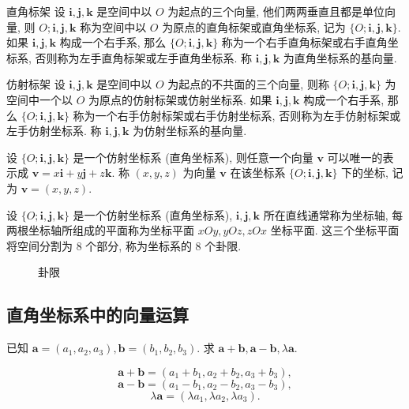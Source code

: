 \documentclass[cn,toc=twocol]{elegantbook}
\newcommand{\ve}[1]{\boldsymbol{#1}}
\newcommand{\FIGS}{
	\begin{figure}[H]
	\centering
}
\newcommand{\FIGE}{
	\end{figure}
}
\begin{document}
\begin{definition}{直角标架}
	设 $\ve{i},\ve{j},\ve{k}$ 是空间中以 $O$ 为起点的三个向量, 他们两两垂直且都是单位向量, 则 $O; \ve{i},\ve{j},\ve{k}$ 称为空间中以 $O$ 为原点的直角标架或直角坐标系, 记为 $\{O;\ve{i},\ve{j},\ve{k}\}$. 如果 $\ve{i},\ve{j},\ve{k}$ 构成一个右手系, 那么 $\{O; \ve{i},\ve{j},\ve{k}\}$ 称为一个右手直角标架或右手直角坐标系, 否则称为左手直角标架或左手直角坐标系. 称 $\ve{i},\ve{j},\ve{k}$ 为直角坐标系的基向量.
\end{definition}

\begin{definition}{仿射标架}
	设 $\ve{i},\ve{j},\ve{k}$ 是空间中以 $O$ 为起点的不共面的三个向量, 则称 $\{O;\ve{i},\ve{j},\ve{k}\}$ 为空间中一个以 $O$ 为原点的仿射标架或仿射坐标系. 如果 $\ve{i},\ve{j},\ve{k}$ 构成一个右手系, 那么 $\{O; \ve{i},\ve{j},\ve{k}\}$ 称为一个右手仿射标架或右手仿射坐标系, 否则称为左手仿射标架或左手仿射坐标系. 称 $\ve{i},\ve{j},\ve{k}$ 为仿射坐标系的基向量.
\end{definition}

\begin{theorem}
	设 $\{O; \ve{i},\ve{j},\ve{k}\}$ 是一个仿射坐标系 (直角坐标系), 则任意一个向量 $\ve{v}$ 可以唯一的表示成 $\ve{v} = x\ve{i} + y\ve{j} + z\ve{k}$. 称 $(x,y,z)$ 为向量 $\ve{v}$ 在该坐标系 $\{O; \ve{i},\ve{j},\ve{k}\}$ 下的坐标, 记为 $\ve{v} = (x,y,z)$.
\end{theorem}

\begin{definition}
	设 $\{O; \ve{i},\ve{j},\ve{k}\}$ 是一个仿射坐标系 (直角坐标系), $\ve{i},\ve{j},\ve{k}$ 所在直线通常称为坐标轴, 每两根坐标轴所组成的平面称为坐标平面 $xOy, yOz, zOx$ 坐标平面. 这三个坐标平面将空间分割为 $8$ 个部分, 称为坐标系的 $8$ 个卦限.
\end{definition}

\FIGS
%
\caption{卦限}
\FIGE

\subsection{直角坐标系中的向量运算}

\begin{example}
	已知 $\ve a = (a_1,a_2,a_3), \ve b = (b_1,b_2,b_3)$. 求 $\ve a + \ve b, \ve a - \ve b, \lambda \ve a$. 
\end{example}

\begin{solution}
	\[
		\ve a + \ve b = (a_1 + b_1, a_2 + b_2, a_3 + b_3),
	\]
	\[
		\ve a - \ve b = (a_1 - b_1, a_2 - b_2, a_3 - b_3),
	\]
	\[
		\lambda \ve a = (\lambda a_1, \lambda a_2, \lambda a_3).
	\]
\end{solution}
\vspace{0.5em}
\end{document}
